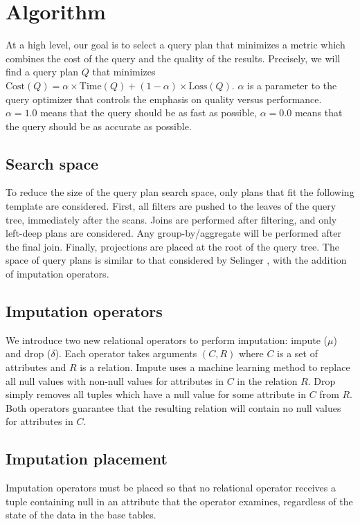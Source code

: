 \section{Algorithm}

At a high level, our goal is to select a query plan that minimizes a metric which combines the cost of the query and the quality of the results.
Precisely, we will find a query plan $Q$ that minimizes $\text{Cost}(Q) = \alpha \times \text{Time}(Q) + (1 - \alpha) \times \text{Loss}(Q)$. $\alpha$ is a parameter to the query optimizer that controls the emphasis on quality versus performance. $\alpha = 1.0$ means that the query should be as fast as possible, $\alpha=0.0$ means that the query should be as accurate as possible.

\subsection{Search space}
To reduce the size of the query plan search space, only plans that fit the following template are considered. First, all filters are pushed to the leaves of the query tree, immediately after the scans. Joins are performed after filtering, and only left-deep plans are considered. Any group-by/aggregate will be performed after the final join. Finally, projections are placed at the root of the query tree. The space of query plans is similar to that considered by Selinger , with the addition of imputation operators.

\subsection{Imputation operators}
We introduce two new relational operators to perform imputation: impute ($\mu$) and drop ($\delta$). Each operator takes arguments $(C, R)$ where $C$ is a set of attributes and $R$ is a relation. Impute uses a machine learning method to replace all null values with non-null values for attributes in $C$ in the relation $R$. Drop simply removes all tuples which have a null value for some attribute in $C$ from $R$. Both operators guarantee that the resulting relation will contain no null values for attributes in $C$. 

\subsection{Imputation placement}
Imputation operators must be placed so that no relational operator receives a tuple containing null in an attribute that the operator examines, regardless of the state of the data in the base tables.

